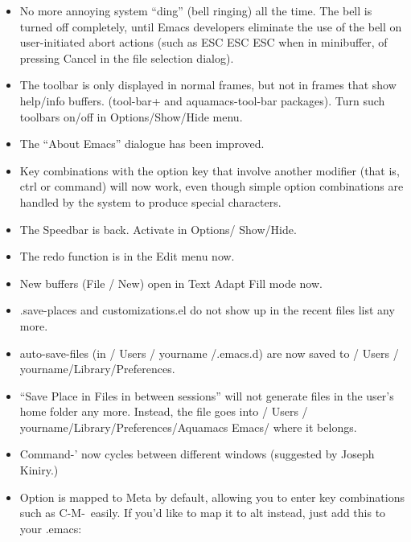 \begin{itemize}
\item No more annoying system ``ding'' (bell ringing) all the time.  The bell is
    turned off completely, until Emacs developers eliminate the use of
    the bell on user-initiated abort actions (such as ESC ESC ESC when
    in minibuffer, of pressing Cancel in the file selection dialog).
	
\item The toolbar is only displayed in normal frames, but not
    in frames that show help/info buffers. (tool-bar+ and
    aquamacs-tool-bar packages). Turn such toolbars on/off in
    Options/Show/Hide menu.
	
\item The ``About Emacs'' dialogue has been improved.

\item Key combinations with the option key that  involve
    another modifier (that is, ctrl or command) will now work, even
    though simple option combinations are handled by the system to
    produce special characters.

\item The Speedbar is back. Activate in Options/ Show/Hide.

\item The redo function is in the Edit menu now.

\item New buffers (File / New) open in Text Adapt Fill mode now.

\item .save-places and customizations.el do not show up in the recent  files list
    any more.

\item auto-save-files (in / Users / yourname /.emacs.d) are now saved to / Users / yourname/Library/Preferences.

\item ``Save Place in Files in between sessions'' will not generate  files in the
    user's home folder any more. Instead, the file goes into
    / Users / yourname/Library/Preferences/Aquamacs Emacs/ where it belongs.

\item Command-' now cycles between different windows (suggested  by Joseph Kiniry.)



\item Option is mapped to Meta by default, allowing you to enter key
    combinations such as C-M-\ easily. If you'd like to map it to
    alt instead, just add this to your .emacs:


\end{itemize}
